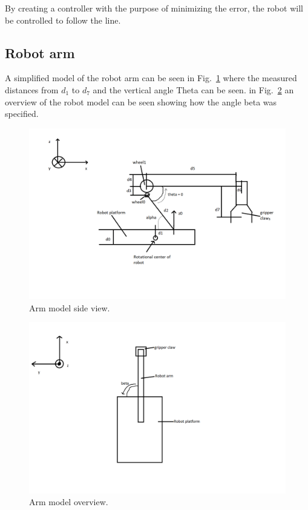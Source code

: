 By creating a controller with the purpose of minimizing the error, the robot will be controlled to follow the line.

\subsection{Robot arm}
A simplified model of the robot arm can be seen in Fig.~\ref{Arm_model} where the measured distances from \(d_1\) to \(d_7\) and the vertical angle Theta can be seen. in Fig.~\ref{arm_overview} an overview of the robot model can be seen showing how the angle beta was specified.
\begin{figure}[h]
    \centering
    \includegraphics[width=\textwidth]{sections/assets/Arm_model.png}
    \caption{Arm model side view.}
    \label{Arm_model}
\end{figure}
\begin{figure}[h]
    \centering
    \includegraphics[width=\textwidth]{sections/assets/Arm_overview.png}
    \caption{Arm model overview.}
    \label{arm_overview}
\end{figure}
